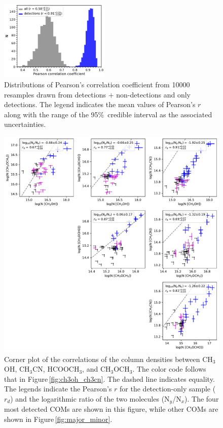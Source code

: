 \documentclass[twocolumn]{aastex62}
\newcommand{\methylformate}{\mbox{HCOOCH$_{3}$}}
\newcommand{\methanol}{\mbox{CH$_{3}$OH}}
\newcommand{\dimethylether}{\mbox{CH$_{3}$OCH$_{3}$}}
\newcommand{\methylcyanide}{\mbox{CH$_{3}$CN}}
\begin{document}
\begin{figure}[htbp!]
  \centering
  \includegraphics[width=0.47\textwidth]{pearson_r_ch3oh_ch3cn.pdf}
  \caption{Distributions of Pearson's correlation coefficient from 10000 resamples drawn from detections $+$ non-detections and only detections.  The legend indicates the mean values of Pearson's $r$ along with the range of the 95\%\ credible interval as the associated uncertainties.}
  \label{fig:pearson_distribution}
\end{figure}

\begin{figure}[htbp!]
  \centering
  \includegraphics[width=\textwidth]{corner_Ncol_correlations.pdf}
  \caption{Corner plot of the correlations of the column densities between \methanol, \methylcyanide, \methylformate, and \dimethylether.  The color code follows that in Figure\,\ref{fig:ch3oh_ch3cn}.  The dashed line indicates equality.  The legends indicate the Pearson's $r$ for the detection-only sample ($r_{d}$) and the logarithmic ratio of the two molecules (N$_{y}$/N$_{x}$).  The four most detected COMs are shown in this figure, while other COMs are shown in Figure\,\ref{fig:major_minor}.}
  \label{fig:corner}
\end{figure}
\end{document}

